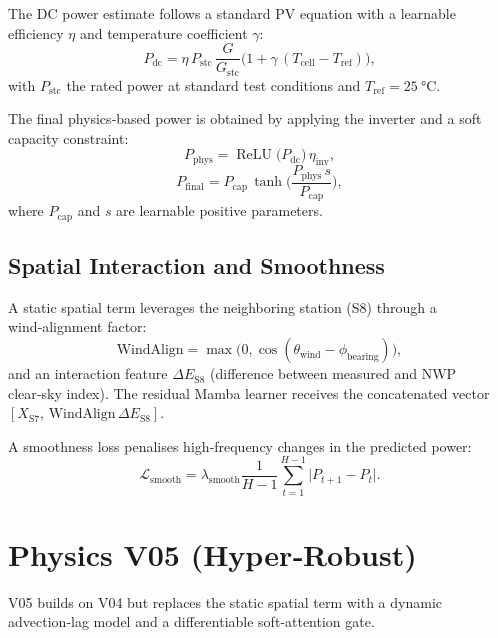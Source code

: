 \documentclass{article}
\begin{document}
The DC power estimate follows a standard PV equation with a learnable efficiency $\eta$ and temperature coefficient $\gamma$:
\begin{equation}
  P_{\text{dc}} = \eta\,P_{\text{stc}}\,\frac{G}{G_{\text{stc}}}\bigl(1 + \gamma\,(T_{\text{cell}} - T_{\text{ref}})\bigr),
  \label{eq:dc_power}
\end{equation}
with $P_{\text{stc}}$ the rated power at standard test conditions and $T_{\text{ref}}=\SI{25}{\celsius}$.

The final physics‑based power is obtained by applying the inverter and a soft capacity constraint:
\begin{equation}
  P_{\text{phys}} = \operatorname{ReLU}\bigl(P_{\text{dc}}\bigr)\,\eta_{\text{inv}},
\end{equation}
\begin{equation}
  P_{\text{final}} = P_{\text{cap}}\,\tanh\bigl(\frac{P_{\text{phys}}\,s}{P_{\text{cap}}}\bigr),
\end{equation}
where $P_{\text{cap}}$ and $s$ are learnable positive parameters.

\subsection{Spatial Interaction and Smoothness}
A static spatial term leverages the neighboring station (S8) through a wind‑alignment factor:
\begin{equation}
  \text{WindAlign}=\max\bigl(0,\cos(\theta_{\text{wind}}-\phi_{\text{bearing}})\bigr),
\end{equation}
and an interaction feature $\Delta E_{\text{S8}}$ (difference between measured and NWP clear‑sky index). The residual Mamba learner receives the concatenated vector $[X_{\text{S7}},\,\text{WindAlign}\,\Delta E_{\text{S8}}]$.

A smoothness loss penalises high‑frequency changes in the predicted power:
\begin{equation}
  \mathcal{L}_{\text{smooth}} = \lambda_{\text{smooth}}\frac{1}{H-1}\sum_{t=1}^{H-1}\bigl|P_{t+1}-P_{t}\bigr|.
\end{equation}

\section{Physics V05 (Hyper‑Robust)}

V05 builds on V04 but replaces the static spatial term with a dynamic advection‑lag model and a differentiable soft‑attention gate.
\end{document}
